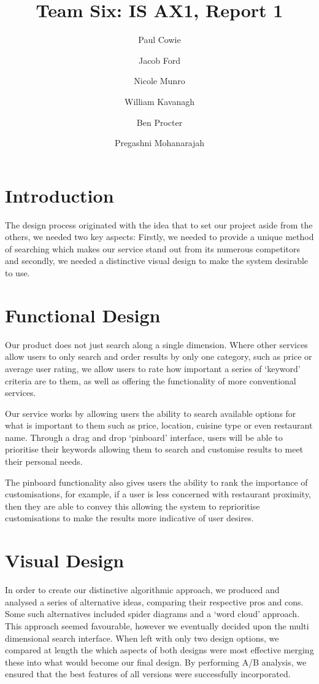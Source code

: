\documentclass[10pt,a4paper]{article}
\author{Paul Cowie \and Jacob Ford \and Nicole Munro \and William Kavanagh \and Ben Procter \and Pregashni Mohanarajah }
\date{}
\title{Team Six: IS AX1, Report 1}
\begin{document}
\maketitle

\section*{Introduction}
The design process originated with the idea that to set our project aside from the others, we needed two key aspects:
Firstly, we needed to provide a unique method of searching which makes our service stand out from its numerous competitors and secondly, we needed a distinctive visual design to make the system desirable to use.
\section*{Functional Design}


Our product does not just search along a single dimension. Where other services allow users to only search and order results by only one category, such as price or average user rating, we allow users to rate how important a series of ‘keyword’ criteria are to them, as well as offering the functionality of more conventional services.

Our service works by allowing users the ability to search available options for what is important to them such as price, location, cuisine type or even restaurant name. Through a drag and drop ‘pinboard’ interface, users will be able to prioritise their keywords allowing them to search and customise results to meet their personal needs.

The pinboard functionality also gives users the ability to rank the importance of customisations, for example, if a user is less concerned with restaurant proximity, then they are able to convey this allowing the system to reprioritise customisations to make the results more indicative of user desires.

\section*{Visual Design}

In order to create our distinctive algorithmic approach, we produced and analysed a series of alternative ideas, comparing their respective pros and cons. Some such alternatives included spider diagrams and a ‘word cloud’ approach. This approach seemed favourable, however we eventually decided upon the multi dimensional search interface. When left with only two design options, we compared at length the which aspects of both designs were most effective merging these into what would become our final design. By performing A/B analysis, we ensured that the best features of all versions were successfully incorporated.
\end{document}
